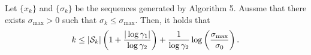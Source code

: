 \documentclass{ExerciseSheet}
\newif\ifsolutions
\begin{document}



   



\vskip 0.5cm

\begin{problem}
 Let $\{x_k\}$ and $\{\sigma_k\}$ be the sequences generated by Algorithm 5. Aussme that there exists $\sigma_\text{max}>0$ such that $\sigma_k\leq \sigma_\text{max}$. Then, it holds that
 \begin{align*}
     k \leq |{\mathcal S}_k| \left(1 + \frac{|\log \gamma_1|}{\log \gamma_2}\right) + \frac{1}{\log \gamma_2} \log \left(\frac{\sigma_{\max}}{\sigma_0}\right).
 \end{align*}
\end{problem}

\ifsolutions
\vskip 0.3cm
\end{document}
